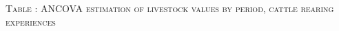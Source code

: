 \vspace{-1cm}\hspace{-1cm}\begin{minipage}[t]{14cm}
\hfil\textsc{\normalsize Table \thetable: ANCOVA estimation of livestock values by period, cattle rearing experiences\label{tab ANCOVA livestock values Experience timevarying}}\\
\setlength{\tabcolsep}{1pt}
\setlength{\baselineskip}{8pt}
\renewcommand{\arraystretch}{.52}
\hfil{}
\end{minipage}

